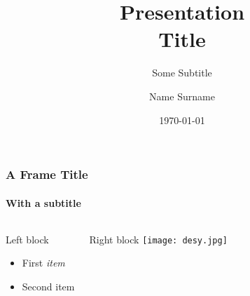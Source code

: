 \documentclass[10pt,t]{beamer}
\title{Presentation\\Title}
\subtitle{Some Subtitle}
\author[N. Surname]{Name Surname}
\institute[ShortConf]{Conference Name}
\date[\today]{\today}
\begin{document}
\maketitle

\begin{frame}
	\frametitle{A Frame Title}
	\framesubtitle{With a subtitle}
    \begin{columns}[onlytextwidth]
        \begin{block}{Left block}
        \begin{itemize}
            \item First \emph<1>{item}
            \item Second \alert<2>{item}
        \end{itemize}
        \end{block}
        \begin{block}{Right block}
            \texttt{[image: desy.jpg]}
        \end{block}
    \end{columns}
\end{frame}
\end{document}
